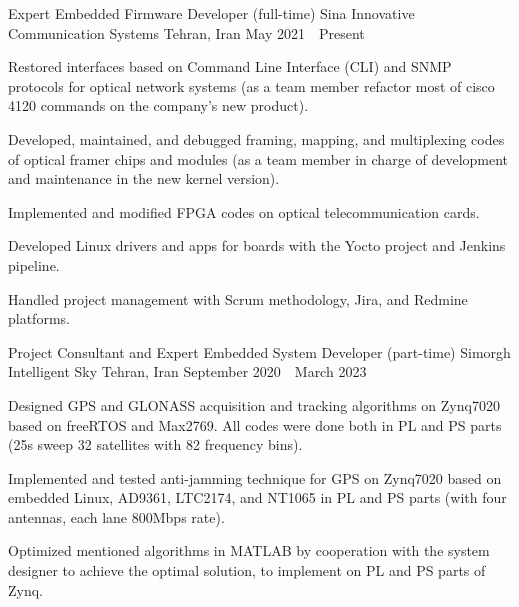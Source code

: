 


\begin{cventries}

  \cventry
    {Expert Embedded Firmware Developer (full-time)} %
    {Sina Innovative Communication Systems} %
    {Tehran, Iran} %
    {May 2021~\textendash~Present} %
    {
      \begin{cvitems} %
        \item {Restored interfaces based on Command Line Interface (CLI) and SNMP protocols for optical network systems (as a team member refactor most of cisco 4120 commands on the company's new product).}
	      \item {Developed, maintained, and debugged framing, mapping, and multiplexing codes of optical framer chips and modules (as a team member in charge of development and maintenance in the new kernel version).}
        \item {Implemented and modified FPGA codes on optical telecommunication cards.}
	      \item {Developed Linux drivers and apps for boards with the Yocto project and Jenkins pipeline.}
	      \item {Handled project management with Scrum methodology, Jira, and Redmine platforms.}
      \end{cvitems}
    }

  \cventry
    {Project Consultant and Expert Embedded System Developer (part-time)} %
    {Simorgh Intelligent Sky} %
    {Tehran, Iran} %
    {September 2020~\textendash~March 2023} %
    {
      \begin{cvitems} %
        \item {Designed GPS and GLONASS acquisition and tracking algorithms on Zynq7020 based on freeRTOS and Max2769. All codes were done both in PL and PS parts (25s sweep 32 satellites with 82 frequency bins).}
        \item {Implemented and tested anti-jamming technique for GPS on Zynq7020 based on embedded Linux, AD9361, LTC2174, and NT1065 in PL and PS parts (with four antennas, each lane 800Mbps rate).}
	      \item {Optimized mentioned algorithms in MATLAB by cooperation with the system designer to achieve the optimal solution, to implement on PL and PS parts of Zynq.}
      \end{cvitems}
    }


\end{cventries}
